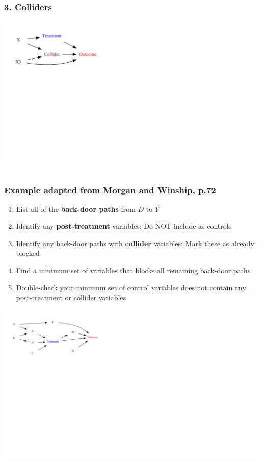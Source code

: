 \documentclass[xcolor=x11names,compress]{beamer}\usepackage[]{graphicx}\usepackage[]{color}
\newenvironment{knitrout}{}{} %
\renewcommand{\(}{\begin{columns}}
\renewcommand{\)}{\end{columns}}
\newcommand{\<}[1]{\begin{column}{#1}}
\renewcommand{\>}{\end{column}}
\begin{document}
\begin{frame}
\frametitle{3. Colliders}
\begin{knitrout}
\color{fgcolor}
\includegraphics[width=2.7\linewidth]{figure/Dag5b-1} 

\end{knitrout}
\end{frame}

\begin{frame}
\frametitle{Example adapted from Morgan and Winship, p.72}
\begin{enumerate}
\footnotesize
\item List all of the \textbf{back-door paths} from $D$ to $Y$
\pause
\item Identify any \textbf{post-treatment} variables: Do NOT include as controls
\pause
\item Identify any back-door paths with \textbf{collider} variables: Mark these as already blocked
\pause
\item Find a minimum set of variables that blocks all remaining back-door paths
\pause
\item Double-check your minimum set of control variables does not contain any post-treatment or collider variables
\end{enumerate}
\normalsize
\begin{knitrout}
\color{fgcolor}
\includegraphics[width=2.4\linewidth]{figure/Dag5_eg-1} 

\end{knitrout}
\end{frame}
\end{document}
